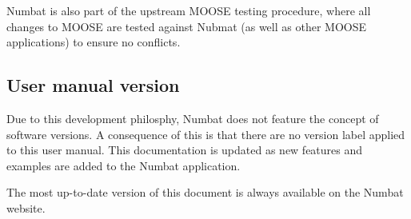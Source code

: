 \documentclass[12pt, a4paper, midday, formal]{csiroreport2017}
\begin{document}
Numbat is also part of the upstream MOOSE testing procedure, where all changes to MOOSE are tested against
Nubmat (as well as other MOOSE applications) to ensure no conflicts.

\subsection{User manual version}

Due to this development philosphy, Numbat does not feature the concept of software versions. A consequence of this
is that there are no version label applied to this user manual. This documentation is updated as new features and
examples are added to the Numbat application.

The most up-to-date version of this document is always available on the Numbat website.

%
%










%
%
\clearpage


\end{document}
